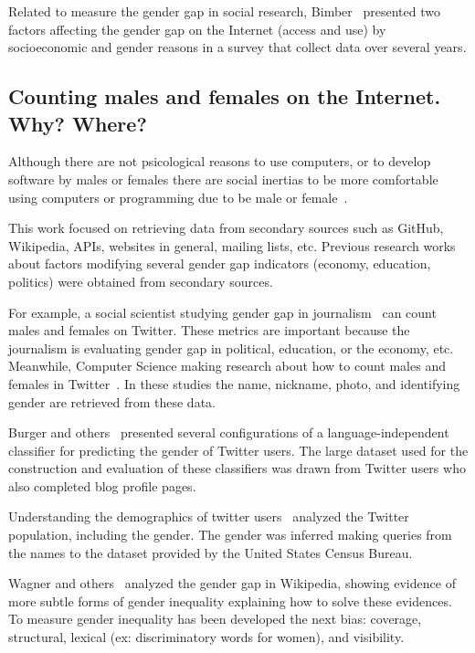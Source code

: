 \documentclass[a4paper]{article}
\begin{document}
Related to measure the gender gap in social research,
Bimber~\cite{bimber2000measuring} presented two factors affecting
the gender gap on the Internet (access and use) by socioeconomic and gender
reasons in a survey that collect data over several years.

\subsection{Counting males and females on the Internet. Why? Where?}

Although there are not psicological reasons to use computers, or to develop
software by males or females there are social inertias to be more
comfortable using computers or programming due to be male or
female~\cite{buchbinder2015papel}.

This work focused on retrieving data from secondary sources such as
GitHub, Wikipedia, APIs, websites in general, mailing lists, etc.
Previous research works about factors modifying several gender gap
indicators (economy, education, politics) were obtained from secondary
sources.

For example, a social scientist studying gender gap in
journalism~\cite{alvarez2012journalism} can count males and
females on Twitter. These metrics are important because the journalism
is evaluating gender gap in political, education, or the economy,
etc. Meanwhile, Computer Science making research about how to
count males and females in Twitter~\cite{burger2011discriminating}. In
these studies the name, nickname, photo, and identifying gender are
retrieved from these data.

Burger and others~\cite{burger2011discriminating} presented
several configurations of a
language-independent classifier for predicting the gender of Twitter
users. The large dataset used for the construction and evaluation of
these classifiers was drawn from Twitter users who also completed blog
profile pages.

Understanding the demographics of twitter users~\cite{mislove2011understanding}
analyzed the Twitter population, including the gender. The gender
was inferred making queries from the names to the dataset provided
by the United States Census Bureau.

Wagner and others~\cite{wagner2015s} analyzed the gender gap in Wikipedia,
showing evidence of more subtle forms of gender inequality explaining
how to solve these evidences. To measure gender inequality has been
developed the next bias: coverage, structural, lexical (ex:
discriminatory words for women), and visibility.
\end{document}
